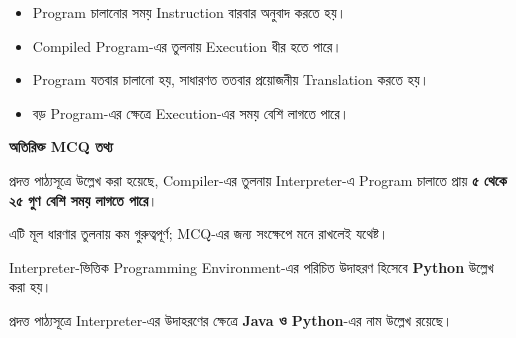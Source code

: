 
\begin{itemize}

\item Program চালানোর সময় Instruction বারবার অনুবাদ করতে হয়।

\item Compiled Program-এর তুলনায় Execution ধীর হতে পারে।

\item Program যতবার চালানো হয়, সাধারণত ততবার প্রয়োজনীয়
Translation করতে হয়।

\item বড় Program-এর ক্ষেত্রে Execution-এর সময় বেশি লাগতে পারে।

\end{itemize}

\begin{rememberbox}

\textbf{\color{deepOrange}অতিরিক্ত MCQ তথ্য}

প্রদত্ত পাঠ্যসূত্রে উল্লেখ করা হয়েছে, Compiler-এর তুলনায়
Interpreter-এ Program চালাতে প্রায়
\textbf{৫ থেকে ২৫ গুণ বেশি সময় লাগতে পারে}।

এটি মূল ধারণার তুলনায় কম গুরুত্বপূর্ণ; MCQ-এর জন্য সংক্ষেপে
মনে রাখলেই যথেষ্ট।

\end{rememberbox}


Interpreter-ভিত্তিক Programming Environment-এর পরিচিত উদাহরণ
হিসেবে \textbf{Python} উল্লেখ করা হয়।

প্রদত্ত পাঠ্যসূত্রে Interpreter-এর উদাহরণের ক্ষেত্রে
\textbf{Java ও Python}-এর নাম উল্লেখ রয়েছে।



